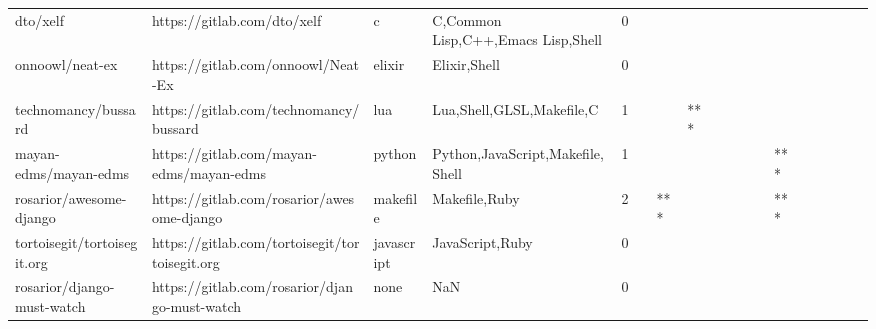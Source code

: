 \begin{tabular}{llllrlllllllllllll}
dto/xelf                                           &                        https://gitlab.com/dto/xelf &                 c &                 C,Common Lisp,C++,Emacs Lisp,Shell &       0 &         &        &           &                &                 &        &           &           &          &          &       &              &          \\
onnoowl/neat-ex                                    &                 https://gitlab.com/onnoowl/Neat-Ex &            elixir &                                       Elixir,Shell &       0 &         &        &           &                &                 &        &           &           &          &          &       &              &          \\
technomancy/bussard                                &             https://gitlab.com/technomancy/bussard &               lua &                          Lua,Shell,GLSL,Makefile,C &       1 &         &        &       *** &                &                 &        &           &           &          &          &       &              &          \\
mayan-edms/mayan-edms                              &           https://gitlab.com/mayan-edms/mayan-edms &            python &                   Python,JavaScript,Makefile,Shell &       1 &         &        &           &                &                 &        &           &       *** &          &          &       &              &          \\
rosarior/awesome-django                            &         https://gitlab.com/rosarior/awesome-django &          makefile &                                      Makefile,Ruby &       2 &         &    *** &           &                &                 &        &           &       *** &          &          &       &              &          \\
tortoisegit/tortoisegit.org                        &     https://gitlab.com/tortoisegit/tortoisegit.org &        javascript &                                    JavaScript,Ruby &       0 &         &        &           &                &                 &        &           &           &          &          &       &              &          \\
rosarior/django-must-watch                         &      https://gitlab.com/rosarior/django-must-watch &              none &                                                NaN &       0 &         &        &           &                &                 &        &           &           &          &          &       &              &          \\

\end{tabular}

